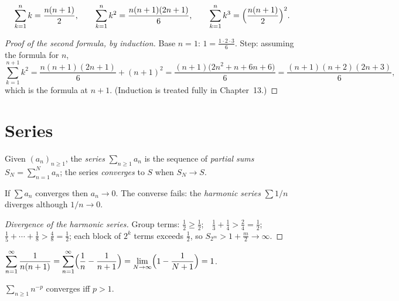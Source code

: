 \begin{theorem}\label{thm:sums}
\[
\sum_{k=1}^{n} k = \frac{n(n+1)}{2},\qquad
\sum_{k=1}^{n} k^2 = \frac{n(n+1)(2n+1)}{6},\qquad
\sum_{k=1}^{n} k^3 = \Bigl(\frac{n(n+1)}{2}\Bigr)^{2}.
\]
\end{theorem}

\begin{proof}[Proof of the second formula, by induction]
Base $n=1$: $1 = \frac{1\cdot 2\cdot 3}{6}$. Step: assuming the formula for
$n$,
\[
\sum_{k=1}^{n+1} k^2
= \frac{n(n+1)(2n+1)}{6} + (n+1)^2
= \frac{(n+1)\bigl(2n^2 + n + 6n + 6\bigr)}{6}
= \frac{(n+1)(n+2)(2n+3)}{6},
\]
which is the formula at $n+1$. (Induction is treated fully in Chapter~13.)
\end{proof}

\section{Series}

\begin{definition}
Given $(a_n)_{n\ge 1}$, the \emph{series} $\sum_{n\ge 1} a_n$ is the sequence
of \emph{partial sums} $S_N = \sum_{n=1}^{N} a_n$; the series
\emph{converges} to $S$ when $S_N \to S$.
\end{definition}

\begin{theorem}\label{thm:nec}
If $\sum a_n$ converges then $a_n \to 0$. The converse fails: the
\emph{harmonic series} $\sum 1/n$ diverges although $1/n \to 0$.
\end{theorem}

\begin{proof}[Divergence of the harmonic series]
Group terms:
$\tfrac12 \ge \tfrac12$;\ \
$\tfrac13 + \tfrac14 > \tfrac24 = \tfrac12$;\ \
$\tfrac15 + \cdots + \tfrac18 > \tfrac48 = \tfrac12$; each block of
$2^k$ terms exceeds $\tfrac12$, so $S_{2^m} > 1 + \tfrac{m}{2} \to \infty$.
\end{proof}

\begin{example}[Telescoping]
$\displaystyle\sum_{n=1}^{\infty} \frac{1}{n(n+1)}
= \sum_{n=1}^{\infty}\Bigl(\frac{1}{n} - \frac{1}{n+1}\Bigr)
= \lim_{N\to\infty}\Bigl(1 - \frac{1}{N+1}\Bigr) = 1$.
\end{example}

\begin{theorem}[$p$-series]
$\sum_{n\ge1} n^{-p}$ converges iff $p > 1$.
\end{theorem}

